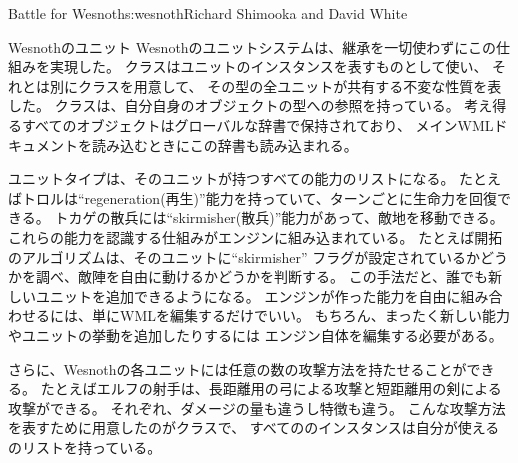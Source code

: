 \begin{aosachapter}{Battle for Wesnoth}{s:wesnoth}{Richard Shimooka and David White}
\begin{aosasect1}{Wesnothのユニット}
Wesnothのユニットシステムは、継承を一切使わずにこの仕組みを実現した。
クラスはユニットのインスタンスを表すものとして使い、
それとは別にクラスを用意して、
その型の全ユニットが共有する不変な性質を表した。
クラスは、自分自身のオブジェクトの型への参照を持っている。
考え得るすべてのオブジェクトはグローバルな辞書で保持されており、
メインWMLドキュメントを読み込むときにこの辞書も読み込まれる。

ユニットタイプは、そのユニットが持つすべての能力のリストになる。
たとえばトロルは``regeneration(再生)''能力を持っていて、ターンごとに生命力を回復できる。
トカゲの散兵には``skirmisher(散兵)''能力があって、敵地を移動できる。
これらの能力を認識する仕組みがエンジンに組み込まれている。
たとえば開拓のアルゴリズムは、そのユニットに``skirmisher''
フラグが設定されているかどうかを調べ、敵陣を自由に動けるかどうかを判断する。
この手法だと、誰でも新しいユニットを追加できるようになる。
エンジンが作った能力を自由に組み合わせるには、単にWMLを編集するだけでいい。
もちろん、まったく新しい能力やユニットの挙動を追加したりするには
エンジン自体を編集する必要がある。

さらに、Wesnothの各ユニットには任意の数の攻撃方法を持たせることができる。
たとえばエルフの射手は、長距離用の弓による攻撃と短距離用の剣による攻撃ができる。
それぞれ、ダメージの量も違うし特徴も違う。
こんな攻撃方法を表すために用意したのがクラスで、
すべてののインスタンスは自分が使えるのリストを持っている。


\end{aosasect1}
\end{aosachapter}
